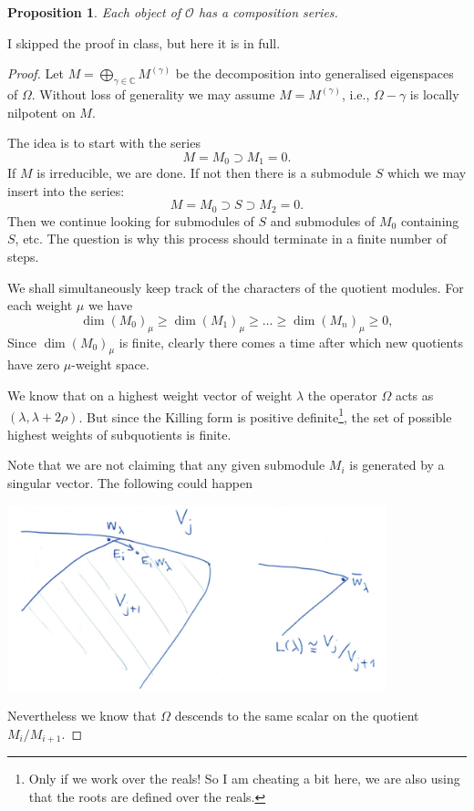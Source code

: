 \documentclass[12pt]{article}
\theoremstyle{plain}
\newtheorem{prop}[thm]{Proposition}
\theoremstyle{definition}
\numberwithin{equation}{section}
\newcommand{\la}{\lambda}
\newcommand{\C}{\mathbb{C}}
\newcommand{\OO}{\mathcal{O}}
\begin{document}
\begin{prop}\label{prop:weak-block-condition}
Each object of $\OO$ has a composition series.
\end{prop}


{\color{blue}I skipped the proof in class, but here it is in full.}


\begin{proof}
Let $M = \bigoplus_{\gamma \in \C} M^{(\gamma)}$ be the decomposition into generalised eigenspaces of $\Omega$. Without loss of generality we may assume $M = M^{(\gamma)}$, i.e., $\Omega - \gamma$ is locally nilpotent on $M$.

The idea is to start with the series
\[
M = M_0 \supset M_1 = 0.
\]
If $M$ is irreducible, we are done. If not then there is a submodule $S$ which we may insert into the series:
\[
M = M_0 \supset S \supset M_2 = 0.
\]
Then we continue looking for submodules of $S$ and submodules of $M_0$ containing $S$, etc. The question is why this process should terminate in a finite number of steps.

We shall simultaneously keep track of the characters of the quotient modules. For each weight $\mu$ we have
\[
\dim(M_0)_\mu \geq \dim(M_1)_\mu \geq \ldots \geq \dim(M_n)_\mu \geq 0,
\]
Since $\dim(M_0)_\mu$ is finite, clearly there comes a time after which new quotients have zero $\mu$-weight space.

We know that on a highest weight vector of weight $\lambda$ the operator $\Omega$ acts as $(\la, \la + 2\rho)$. But since the Killing form is positive definite\footnote{Only if we work over the reals! So I am cheating a bit here, we are also using that the roots are defined over the reals.}, the set of possible highest weights of subquotients is finite.

Note that we are not claiming that any given submodule $M_i$ is generated by a singular vector. The following could happen

\begin{center}
\includegraphics[width=110mm]{subsing.png}
\end{center}

Nevertheless we know that $\Omega$ descends to the same scalar on the quotient $M_i / M_{i+1}$.
\end{proof}
\end{document}
